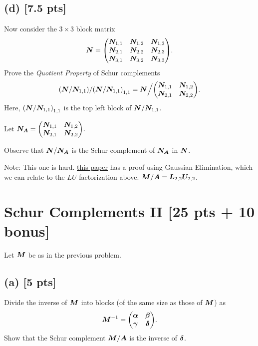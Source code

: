 \documentclass[twoside,10pt]{article}
\begin{document}
\subsection*{(d) [7.5 pts]}
Now consider the $3 \times 3$ block matrix 
\begin{equation}
  \mtx{N} = 
  \begin{pmatrix}
    \mtx{N}_{1, 1} & \mtx{N}_{1, 2} & \mtx{N}_{1, 3} \\
    \mtx{N}_{2, 1} & \mtx{N}_{2, 2} & \mtx{N}_{2, 3} \\
    \mtx{N}_{3, 1} & \mtx{N}_{3, 2} & \mtx{N}_{3, 3}
  \end{pmatrix}.
\end{equation}
Prove the \emph{Quotient Property} of Schur complements
\begin{equation}
  \left(\mtx{N} / \mtx{N}_{1, 1}\right) / \left(\mtx{N} / \mtx{N}_{1, 1}\right)_{1, 1} 
  = 
  \mtx{N} \Big / 
  \begin{pmatrix}
    \mtx{N}_{1, 1} & \mtx{N}_{1, 2} \\
    \mtx{N}_{2, 1} & \mtx{N}_{2, 2} 
  \end{pmatrix}.
\end{equation}
Here, $\left(\mtx{N} / \mtx{N}_{1, 1}\right)_{1, 1}$ is the top left block of $\bm{N} / \bm{N}_{1, 1}$. 

Let $\mtx{N_A} =\begin{pmatrix}
  \mtx{N}_{1, 1} & \mtx{N}_{1, 2} \\
  \mtx{N}_{2, 1} & \mtx{N}_{2, 2} 
\end{pmatrix}.$

Observe that $\bm{N} / \bm{N_A}$ is the Schur complement of $\bm{N_A}$ in $\bm{N}$.

Note: This one is hard. \href{https://www.semanticscholar.org/paper/Determinantal-identities%3A-Gauss%2C-Schur%2C-Cauchy%2C-and-Brualdi-Schneider/f31020074d8320e22710bb428be909076a7d3a48}{this paper} has a proof using Gaussian Elimination, which we can relate to the $LU$ factorization above.
$\bm{M} / \bm{A} = \bm{L}_{2, 2} \bm{U}_{2, 2}$.

\section{Schur Complements II [25 pts + 10 bonus]}
Let $\bm{M}$ be as in the previous problem. 

\subsection*{(a) [5 pts]}
Divide the inverse of $\bm{M}$ into blocks (of the same size as those of $\bm{M}$) as
\begin{equation}
  \mtx{M}^{-1} = 
  \begin{pmatrix}
    \mtx{\alpha} & \mtx{\beta} \\
    \mtx{\gamma} & \mtx{\delta}
  \end{pmatrix}.
\end{equation}
Show that the Schur complement $\bm{M} / \bm{A}$ is the inverse of $\bm{\delta}$.
\end{document}
